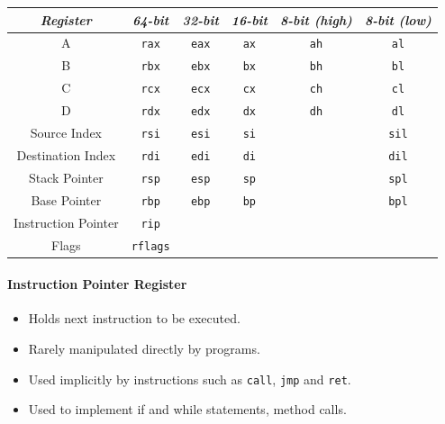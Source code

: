 \documentclass[twocolumn,english]{article}
\providecommand{\tabularnewline}{\\}
\begin{document}
\begin{table}[H]
\noindent \centering{}\texttt{\footnotesize{}}%
\begin{tabular}{cccccc}
\toprule 
\emph{\footnotesize{}Register} & \emph{\footnotesize{}64-bit} & \emph{\footnotesize{}32-bit} & \emph{\footnotesize{}16-bit} & \emph{\footnotesize{}8-bit (high)} & \emph{\footnotesize{}8-bit (low)}\tabularnewline
\midrule
{\footnotesize{}A} & \texttt{\footnotesize{}rax} & \texttt{\footnotesize{}eax} & \texttt{\footnotesize{}ax} & \texttt{\footnotesize{}ah} & \texttt{\footnotesize{}al}\tabularnewline
{\footnotesize{}B} & \texttt{\footnotesize{}rbx} & \texttt{\footnotesize{}ebx} & \texttt{\footnotesize{}bx} & \texttt{\footnotesize{}bh} & \texttt{\footnotesize{}bl}\tabularnewline
{\footnotesize{}C} & \texttt{\footnotesize{}rcx} & \texttt{\footnotesize{}ecx} & \texttt{\footnotesize{}cx} & \texttt{\footnotesize{}ch} & \texttt{\footnotesize{}cl}\tabularnewline
{\footnotesize{}D} & \texttt{\footnotesize{}rdx} & \texttt{\footnotesize{}edx} & \texttt{\footnotesize{}dx} & \texttt{\footnotesize{}dh} & \texttt{\footnotesize{}dl}\tabularnewline
{\footnotesize{}Source Index} & \texttt{\footnotesize{}rsi} & \texttt{\footnotesize{}esi} & \texttt{\footnotesize{}si} &  & \texttt{\footnotesize{}sil}\tabularnewline
{\footnotesize{}Destination Index} & \texttt{\footnotesize{}rdi} & \texttt{\footnotesize{}edi} & \texttt{\footnotesize{}di} &  & \texttt{\footnotesize{}dil}\tabularnewline
{\footnotesize{}Stack Pointer} & \texttt{\footnotesize{}rsp} & \texttt{\footnotesize{}esp} & \texttt{\footnotesize{}sp} &  & \texttt{\footnotesize{}spl}\tabularnewline
{\footnotesize{}Base Pointer} & \texttt{\footnotesize{}rbp} & \texttt{\footnotesize{}ebp} & \texttt{\footnotesize{}bp} &  & \texttt{\footnotesize{}bpl}\tabularnewline
{\footnotesize{}Instruction Pointer} & \texttt{\footnotesize{}rip} &  &  &  & \tabularnewline
{\footnotesize{}Flags} & \texttt{\footnotesize{}rflags} &  &  &  & \tabularnewline
\bottomrule
\end{tabular}
\end{table}



\paragraph{Instruction Pointer Register}
\begin{itemize}
\item Holds next instruction to be executed.
\item Rarely manipulated directly by programs.
\item Used implicitly by instructions such as \texttt{call}, \texttt{jmp}
and \texttt{ret}.
\item Used to implement if and while statements, method calls.
\end{itemize}
\end{document}
